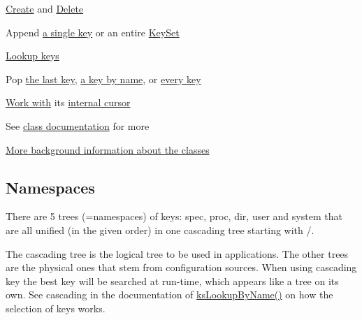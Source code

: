 \begin{DoxyItemize}
\item \hyperlink{group__keyset_ga671e1aaee3ae9dc13b4834a4ddbd2c3c}{Create} and \hyperlink{group__keyset_ga27e5c16473b02a422238c8d970db7ac8}{Delete}
\item Append \hyperlink{group__keyset_gaa5a1d467a4d71041edce68ea7748ce45}{a single key} or an entire \hyperlink{group__keyset_ga21eb9c3a14a604ee3a8bdc779232e7b7}{Key\+Set}
\item \hyperlink{group__keyset_gaa34fc43a081e6b01e4120daa6c112004}{Lookup keys}
\item Pop \hyperlink{group__keyset_gae42530b04defb772059de0600159cf69}{the last key}, \hyperlink{group__keyset_gaa34fc43a081e6b01e4120daa6c112004}{a key by name}, or \hyperlink{group__keyset_gaba1f1dbea191f4d7e7eb3e4296ae7d5e}{every key}
\item \hyperlink{group__keyset_ga317321c9065b5a4b3e33fe1c399bcec9}{Work with} its \hyperlink{group__keyset_ga4287b9416912c5f2ab9c195cb74fb094}{internal cursor}
\item See \hyperlink{group__keyset}{class documentation} for more
\end{DoxyItemize}

\hyperlink{doc_dev_classes_md}{More background information about the classes}

\subsection*{Namespaces}

There are 5 trees (=namespaces) of keys\+: {\ttfamily spec}, {\ttfamily proc}, {\ttfamily dir}, {\ttfamily user} and {\ttfamily system} that are all unified (in the given order) in one cascading tree starting with {\ttfamily /}.

The cascading tree is the logical tree to be used in applications. The other trees are the physical ones that stem from configuration sources. When using cascading key the best key will be searched at run-\/time, which appears like a tree on its own. See cascading in the documentation of \hyperlink{group__keyset_gad2e30fb6d4739d917c5abb2ac2f9c1a1}{ks\+Lookup\+By\+Name()} on how the selection of keys works.


